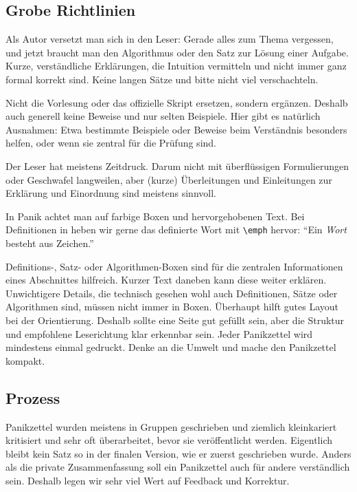 \documentclass{panikzettel}
\begin{document}
\subsection{Grobe Richtlinien}

Als Autor versetzt man sich in den Leser: Gerade alles zum Thema vergessen, und jetzt braucht man den Algorithmus oder den Satz zur Lösung einer Aufgabe.
Kurze, verständliche Erklärungen, die Intuition vermitteln und nicht immer ganz formal korrekt sind.
Keine langen Sätze und bitte nicht viel verschachteln.

Nicht die Vorlesung oder das offizielle Skript ersetzen, sondern ergänzen.
Deshalb auch generell keine Beweise und nur selten Beispiele.
Hier gibt es natürlich Ausnahmen: Etwa bestimmte Beispiele oder Beweise beim Verständnis besonders helfen, oder wenn sie zentral für die Prüfung sind.

Der Leser hat meistens Zeitdruck.
Darum nicht mit überflüssigen Formulierungen oder Geschwafel langweilen, aber (kurze) Überleitungen und Einleitungen zur Erklärung und Einordnung sind meistens sinnvoll.

In Panik achtet man auf farbige Boxen und hervorgehobenen Text.
Bei Definitionen in heben wir gerne das definierte Wort mit \texttt{\textbackslash{}emph} hervor: ``Ein \emph{Wort} besteht aus Zeichen.''

Definitions-, Satz- oder Algorithmen-Boxen sind für die zentralen Informationen eines Abschnittes hilfreich.
Kurzer Text daneben kann diese weiter erklären.
Unwichtigere Details, die technisch gesehen wohl auch Definitionen, Sätze oder Algorithmen sind, müssen nicht immer in Boxen.
Überhaupt hilft gutes Layout bei der Orientierung.
Deshalb sollte eine Seite gut gefüllt sein, aber die Struktur und empfohlene Leserichtung klar erkennbar sein.
Jeder Panikzettel wird mindestens einmal gedruckt.
Denke an die Umwelt und mache den Panikzettel kompakt.

\subsection{Prozess}

Panikzettel wurden meistens in Gruppen geschrieben und ziemlich kleinkariert kritisiert und sehr oft überarbeitet, bevor sie veröffentlicht werden.
Eigentlich bleibt kein Satz so in der finalen Version, wie er zuerst geschrieben wurde.
Anders als die private Zusammenfassung soll ein Panikzettel auch für andere verständlich sein.
Deshalb legen wir sehr viel Wert auf Feedback und Korrektur.
\end{document}
